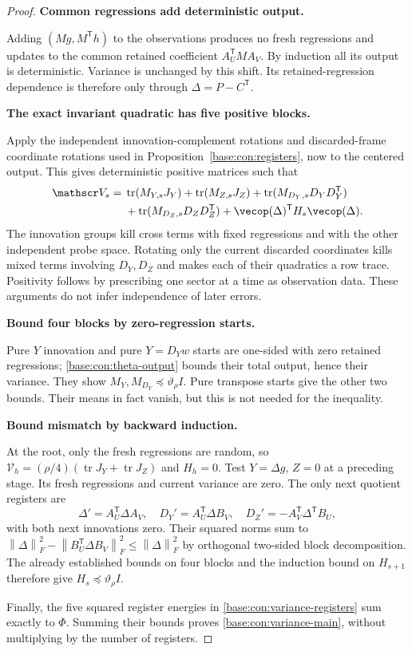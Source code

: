 \documentclass[11pt,oneside,openany,a4paper]{book}
\numberwithin{equation}{chapter}
\theoremstyle{definition}
\theoremstyle{remark}
\newcommand{\proofstep}[1]{\par\addvspace{.45\baselineskip}\Needspace{3\baselineskip}\textbf{#1}\par\nobreak}
\newcommand{\T}{\mathsf T}\newcommand{\Id}{I}
\newcommand{\F}[1]{\left\lVert#1\right\rVert_F}
\DeclareMathOperator{\tr}{tr}\DeclareMathOperator{\rank}{rank}
\begin{document}
\begin{proof}
\proofstep{Common regressions add deterministic output.}
Adding $(Mg,M^\T h)$ to the observations produces no fresh regressions and updates to the common retained coefficient $A_U^\T MA_V$. By induction all its output is deterministic. Variance is unchanged by this shift. Its retained-regression dependence is therefore only through $\Delta=P-C^\T$.

\proofstep{The exact invariant quadratic has five positive blocks.}
Apply the independent innovation-complement rotations and discarded-frame coordinate rotations used in Proposition~\ref{base:con:registers}, now to the centered output. This gives deterministic positive matrices such that
\begin{equation}\label{base:con:variance-registers}
 \begin{split}
 \mathscr V_s={}&\tr(M_{Y,s}J_Y)+\tr(M_{Z,s}J_Z)
 +\tr(M_{D_Y,s}D_YD_Y^\T)\\
 &+\tr(M_{D_Z,s}D_ZD_Z^\T)
 +\vecop(\Delta)^\T H_s\vecop(\Delta).
 \end{split}
\end{equation}
The innovation groups kill cross terms with fixed regressions and with the other independent probe space. Rotating only the current discarded coordinates kills mixed terms involving $D_Y,D_Z$ and makes each of their quadratics a row trace. Positivity follows by prescribing one sector at a time as observation data. These arguments do not infer independence of later errors.

\proofstep{Bound four blocks by zero-regression starts.}
Pure $Y$ innovation and pure $Y=D_Yw$ starts are one-sided with zero retained regressions; \eqref{base:con:theta-output} bounds their total output, hence their variance. They show $M_Y,M_{D_Y}\preceq\vartheta_\rho I$. Pure transpose starts give the other two bounds. Their means in fact vanish, but this is not needed for the inequality.

\proofstep{Bound mismatch by backward induction.}
At the root, only the fresh regressions are random, so
$\mathscr V_h=(\rho/4)(\tr J_Y+\tr J_Z)$ and $H_h=0$.
Test $Y=\Delta g$, $Z=0$ at a preceding stage. Its fresh regressions and current variance are zero. The only next quotient registers are
\[
 \Delta'=A_U^\T\Delta A_V,\quad
 D_Y'=A_U^\T\Delta B_V,\quad
 D_Z'=-A_V^\T\Delta^\T B_U,
\]
with both next innovations zero. Their squared norms sum to
$\F\Delta^2-\F{B_U^\T\Delta B_V}^2\le\F\Delta^2$ by orthogonal two-sided block decomposition. The already established bounds on four blocks and the induction bound on $H_{s+1}$ therefore give $H_s\preceq\vartheta_\rho I$.

Finally, the five squared register energies in \eqref{base:con:variance-registers} sum exactly to $\Phi$. Summing their bounds proves \eqref{base:con:variance-main}, without multiplying by the number of registers.
\end{proof}
\end{document}
